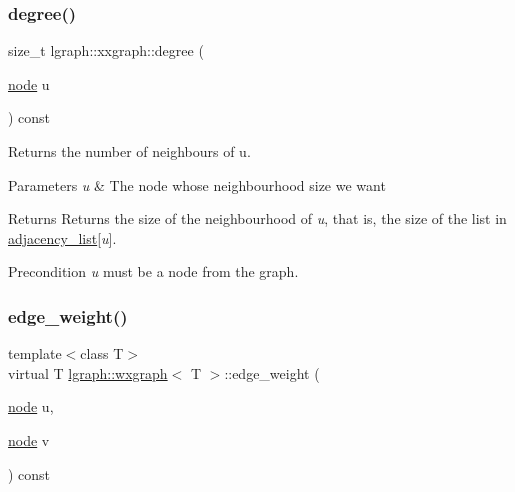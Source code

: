 \subsubsection{\texorpdfstring{degree()}{degree()}}
{\footnotesize\ttfamily size\+\_\+t lgraph\+::xxgraph\+::degree (\begin{DoxyParamCaption}\item[{\hyperlink{namespacelgraph_a397169dd66adf725210a30fb7251773e}{node}}]{u }\end{DoxyParamCaption}) const\hspace{0.3cm}{\ttfamily [inherited]}}



Returns the number of neighbours of u. 


\begin{DoxyParams}{Parameters}
{\em u} & The node whose neighbourhood size we want \\
\hline
\end{DoxyParams}
\begin{DoxyReturn}{Returns}
Returns the size of the neighbourhood of {\itshape u}, that is, the size of the list in \hyperlink{classlgraph_1_1xxgraph_a31cf82d0b20be05290be259dc97a51ec}{adjacency\+\_\+list}\mbox{[}{\itshape u}\mbox{]}. 
\end{DoxyReturn}
\begin{DoxyPrecond}{Precondition}
{\itshape u} must be a node from the graph. 
\end{DoxyPrecond}
\mbox{\label{classlgraph_1_1wxgraph_af5e23332680fdecb6db2fac3b3137982}} 
\subsubsection{\texorpdfstring{edge\+\_\+weight()}{edge\_weight()}}
{\footnotesize\ttfamily template$<$class T$>$ \\
virtual T \hyperlink{classlgraph_1_1wxgraph}{lgraph\+::wxgraph}$<$ T $>$\+::edge\+\_\+weight (\begin{DoxyParamCaption}\item[{\hyperlink{namespacelgraph_a397169dd66adf725210a30fb7251773e}{node}}]{u,  }\item[{\hyperlink{namespacelgraph_a397169dd66adf725210a30fb7251773e}{node}}]{v }\end{DoxyParamCaption}) const\hspace{0.3cm}{\ttfamily [pure virtual]}}



